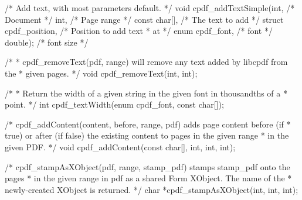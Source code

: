 /* Add text, with most parameters default. */
void cpdf_addTextSimple(int,                  /* Document */
                        int,                  /* Page range */
                        const char[],         /* The text to add */
                        struct cpdf_position, /* Position to add text
                                               * at */
                        enum cpdf_font,       /* font */
                        double);              /* font size */

/*
 * cpdf_removeText(pdf, range) will remove any text added by libcpdf from the
 * given pages.
 */
void cpdf_removeText(int, int);

/*
 * Return the width of a given string in the given font in thousandths of a
 * point.
 */
int cpdf_textWidth(enum cpdf_font, const char[]);

/* cpdf_addContent(content, before, range, pdf) adds page content before (if
 * true) or after (if false) the existing content to pages in the given range
 * in the given PDF. */
void cpdf_addContent(const char[], int, int, int);

/* cpdf_stampAsXObject(pdf, range, stamp_pdf) stamps stamp_pdf onto the pages
 * in the given range in pdf as a shared Form XObject. The name of the
 * newly-created XObject is returned. */
char *cpdf_stampAsXObject(int, int, int);

